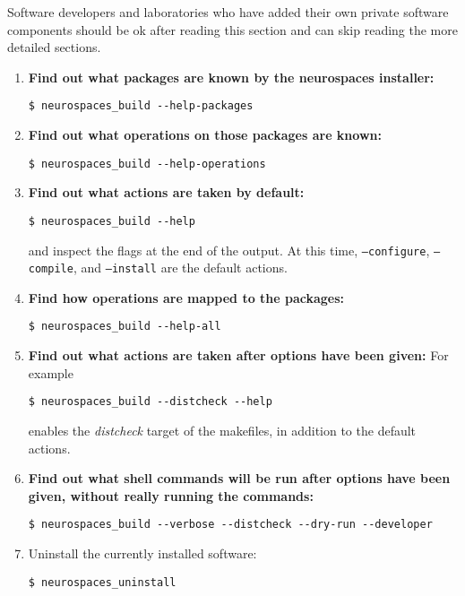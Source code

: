 \documentclass[12pt]{article}
\begin{document}
Software developers and laboratories who have added their own private
software components should be ok after reading this section and can
skip reading the more detailed sections.

\begin{enumerate}
\item {\bf Find out what packages are known by the neurospaces installer:}
\begin{verbatim}
$ neurospaces_build --help-packages
\end{verbatim}

\item {\bf Find out what operations on those packages are known:}
\begin{verbatim}
$ neurospaces_build --help-operations
\end{verbatim}

\item {\bf Find out what actions are taken by default:}
\begin{verbatim}
$ neurospaces_build --help
\end{verbatim}
and inspect the flags at the end of the output. At this time, {\tt --configure}, {\tt --compile}, and {\tt --install} are the default actions. 

\item {\bf Find how operations are mapped to the packages:}
\begin{verbatim}
$ neurospaces_build --help-all
\end{verbatim}

\item {\bf Find out what actions are taken after options have been given:} For example
\begin{verbatim}
$ neurospaces_build --distcheck --help
\end{verbatim}
enables the {\it distcheck} target of the makefiles, in addition to the default actions. 

\item {\bf Find out what shell commands will be run after options have been given, without really running the commands:}
\begin{verbatim}
$ neurospaces_build --verbose --distcheck --dry-run --developer
\end{verbatim}

\item Uninstall the currently installed software:
\begin{verbatim}
$ neurospaces_uninstall
\end{verbatim}


\end{enumerate}
\end{document}

